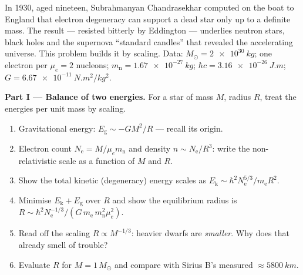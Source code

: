 \begin{problem}\label{pb:b3:quantum-statistics:1}
In 1930, aged nineteen, Subrahmanyan Chandrasekhar computed on the
boat to England that electron degeneracy can support a dead star
only up to a definite mass. The result --- resisted bitterly by
Eddington --- underlies neutron stars, black holes and the
supernova ``standard candles'' that revealed the accelerating
universe. This problem builds it by scaling. Data: $M_\odot =
\qty{2e30}{kg}$; one electron per $\mu_e = 2$ nucleons; $m_{\text{
n}} = \qty{1.67e-27}{kg}$; $\hbar c = \qty{3.16e-26}{J.m}$; $G =
\qty{6.67e-11}{N.m^2/kg^2}$.

\medskip\noindent\textbf{Part I --- Balance of two energies.}
For a star of mass $M$, radius $R$, treat the energies per unit
mass by scaling.
\begin{enumerate}
  \item Gravitational energy: $E_{\text{g}} \sim -GM^2/R$ ---
        recall its origin.
  \item Electron count $N_{\text{e}} = M/\mu_e m_{\text{n}}$ and
        density $n \sim N_{\text{e}}/R^3$: write the
        non-relativistic  scale as a function of $M$
        and $R$.
  \item Show the total kinetic (degeneracy) energy scales as
        $E_{\text{k}} \sim \hbar^2N_{\text{e}}^{5/3}/m_{\text{e}}
        R^2$.
  \item Minimise $E_{\text{k}} + E_{\text{g}}$ over $R$ and show
        the equilibrium radius is
        $R \sim \hbar^2 N_{\text{e}}^{-1/3}/(G\,m_{\text{e}}\,
        m_{\text{n}}^2\mu_e^2)$.
  \item Read off the scaling $R \propto M^{-1/3}$: heavier dwarfs
        are \emph{smaller}. Why does that already smell of
        trouble?
  \item Evaluate $R$ for $M = 1\,M_\odot$ and compare with Sirius
        B's measured $\approx\qty{5800}{km}$.
\end{enumerate}


\end{problem}
